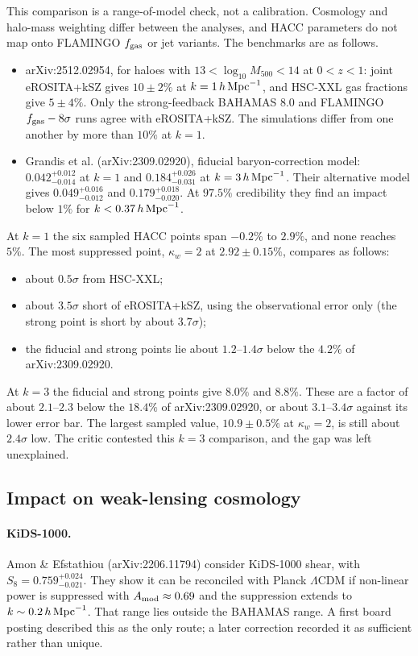 \documentclass[11pt,a4paper]{article}
\begin{document}
This comparison is a range-of-model check, not a calibration. Cosmology and halo-mass weighting differ between the analyses, and HACC parameters do not map onto FLAMINGO $f_{\rm gas}$ or jet variants. The benchmarks are as follows.
\begin{itemize}
\item arXiv:2512.02954, for haloes with $13<\log_{10}M_{500}<14$ at $0<z<1$: joint eROSITA+kSZ gives $10\pm2\%$ at $k=1\,h\,{\rm Mpc}^{-1}$, and HSC-XXL gas fractions give $5\pm4\%$. Only the strong-feedback BAHAMAS 8.0 and FLAMINGO $f_{\rm gas}-8\sigma$ runs agree with eROSITA+kSZ. The simulations differ from one another by more than $10\%$ at $k=1$.
\item Grandis et al. (arXiv:2309.02920), fiducial baryon-correction model: $0.042^{+0.012}_{-0.014}$ at $k=1$ and $0.184^{+0.026}_{-0.031}$ at $k=3\,h\,{\rm Mpc}^{-1}$. Their alternative model gives $0.049^{+0.016}_{-0.012}$ and $0.179^{+0.018}_{-0.020}$. At $97.5\%$ credibility they find an impact below $1\%$ for $k<0.37\,h\,{\rm Mpc}^{-1}$.
\end{itemize}

At $k=1$ the six sampled HACC points span $-0.2\%$ to $2.9\%$, and none reaches $5\%$. The most suppressed point, $\kappa_w=2$ at $2.92\pm0.15\%$, compares as follows:
\begin{itemize}
\item about $0.5\sigma$ from HSC-XXL;
\item about $3.5\sigma$ short of eROSITA+kSZ, using the observational error only (the strong point is short by about $3.7\sigma$);
\item the fiducial and strong points lie about $1.2$--$1.4\sigma$ below the $4.2\%$ of arXiv:2309.02920.
\end{itemize}

At $k=3$ the fiducial and strong points give $8.0\%$ and $8.8\%$. These are a factor of about $2.1$--$2.3$ below the $18.4\%$ of arXiv:2309.02920, or about $3.1$--$3.4\sigma$ against its lower error bar. The largest sampled value, $10.9\pm0.5\%$ at $\kappa_w=2$, is still about $2.4\sigma$ low. The critic contested this $k=3$ comparison, and the gap was left unexplained.

\subsection{Impact on weak-lensing cosmology}

\paragraph{KiDS-1000.} Amon \& Efstathiou (arXiv:2206.11794) consider KiDS-1000 shear, with $S_8=0.759^{+0.024}_{-0.021}$. They show it can be reconciled with Planck $\Lambda$CDM if non-linear power is suppressed with $A_{\rm mod}\approx0.69$ and the suppression extends to $k\sim0.2\,h\,{\rm Mpc}^{-1}$. That range lies outside the BAHAMAS range. A first board posting described this as the only route; a later correction recorded it as sufficient rather than unique.
\end{document}
